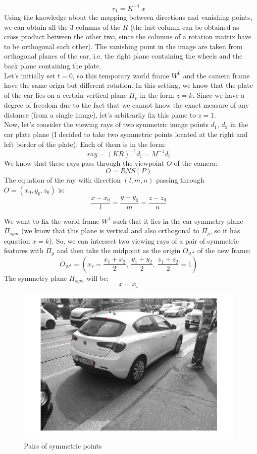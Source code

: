 \documentclass{article}
\begin{document}
$$ r_1 = K^{-1} \: x $$
Using the knowledge about the mapping between directions and vanishing points, we can obtain all the 3 columns of the $R$ (the last column can be obtained as cross product between the other two, since the columns of a rotation matrix have to be orthogonal each other). The vanishing point in the image are taken from orthogonal planes of the car, i.e. the right plane containing the wheels and the back plane containing the plate.
\\
Let's initially set $t=0$, so this temporary world frame $W^0$ and the camera frame have the same orign but different rotation. In this setting, we know that the plate of the car lies on a certain vertical plane $\Pi_p$ in the form $z=k$. Since we have a degree of freedom due to the fact that we cannot know the exact measure of any distance (from a single image), let's arbitrarily fix this plane to $z=1$.
\\
Now, let's consider the viewing rays of two symmetric image points $d_1$, $d_2$ in the car plate plane (I decided to take two symmetric points located at the right and left border of the plate). Each of them is in the form:
$$ ray = (KR)^{-1}d_i = M^{-1}d_i $$
We know that these rays pass through the viewpoint $O$ of the camera:
$$ O = RNS(P) $$
The equation of the ray with direction $(l, m, n)$ passing through $O = (x_0, y_0, z_0)$ is:
$$ \frac{x-x_0}{l} = \frac{y-y_0}{m} = \frac{z-z_0}{n} $$

We want to fix the world frame $W^1$ such that it lies in the car symmetry plane $\Pi_{sym}$ (we know that this plane is vertical and also orthogonal to $\Pi_p$, so it has equation $x=k$). So, we can intersect two viewing rays of a pair of symmetric features with $\Pi_{p}$ and then take the midpoint as the origin $O_{W^1}$ of the new frame:
$$ O_{W^1} = ( x_s = \frac{x_1+x_2}{2}, \: \frac{y_1+y_2}{2}, \: \frac{z_1+z_2}{2}=1 ) $$
The symmetry plane $\Pi_{sym}$ will be:
$$ x=x_s $$

\begin{figure}[h!]
\centering
\includegraphics[scale=0.35]{images/homework_14.png}
\caption{Pairs of symmetric points}
\label{fig:symmetricfeatures}
\end{figure}
\end{document}
